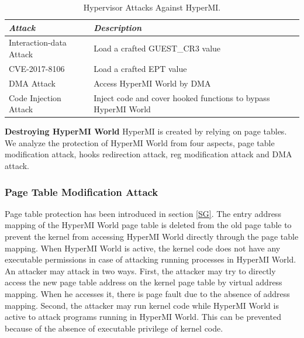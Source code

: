 \documentclass[conference]{IEEEtran}
\begin{document}
\begin{table}
\centering
\caption{Hypervisor Attacks Against HyperMI.}\label{tab3}
\begin{tabular}{p{2.8cm}|p{5.5cm}}
\hline
{\itshape\bfseries Attack} & {\itshape\bfseries Description} \\
\hline
Interaction-data Attack & Load a crafted GUEST\_CR3 value\\
\hline
CVE-2017-8106 & Load a crafted EPT value \\
\hline
DMA Attack & Access HyperMI World by DMA \\
\hline
Code Injection Attack & Inject code and cover hooked functions to bypass HyperMI World \\
\hline
\end{tabular}
\end{table}

\textbf{Destroying HyperMI World}
HyperMI is created by relying on page tables.
We analyze the protection of HyperMI World from four aspects, page table modification attack, hooks redirection attack, reg modification attack and DMA attack.


\subsubsection{Page Table Modification Attack}

Page table protection has been introduced in section \ref{SG}. The entry address mapping of the HyperMI World page table is deleted from the old page table to prevent the kernel from accessing HyperMI World directly through the page table mapping. When HyperMI World is active, the kernel code does not have any executable permissions in case of attacking running processes in HyperMI World. An attacker may attack in two ways.
First, the attacker may try to directly access the new page table address on the kernel page table by virtual address mapping. When he accesses it, there is page fault due to the absence of address mapping.
Second, the attacker may run kernel code while HyperMI World is active to attack programs running in HyperMI World. This can be prevented because of the absence of executable privilege of kernel code.
\end{document}
